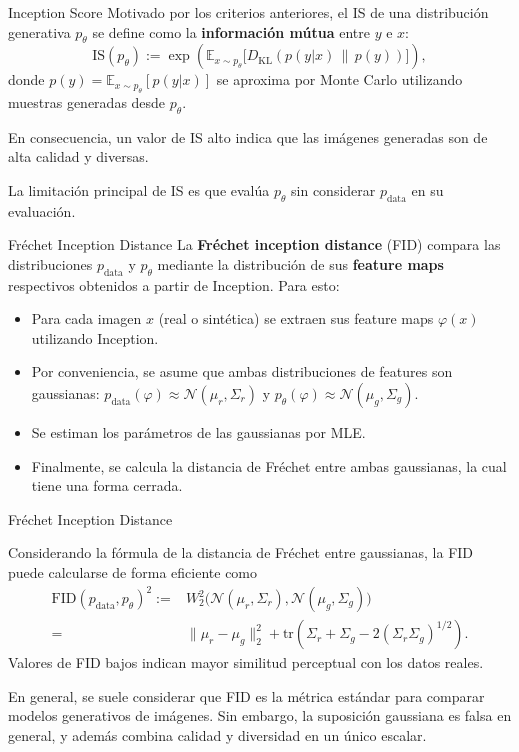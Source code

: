 \documentclass{beamer}
\begin{document}
\begin{frame}{Inception Score}
    Motivado por los criterios anteriores, el IS de una distribución generativa $p_\theta$ se define como la \textbf{información mútua} entre $y$ e $x$:
    \begin{equation*}
        \mathrm{IS}(p_\theta) := \exp\!\left(\mathbb{E}_{x\sim p_\theta}\bigl[D_\mathrm{KL}(p(y|x)\,\|\,p(y))\bigr]\right),
    \end{equation*}
    donde $p(y)=\mathbb{E}_{x\sim p_\theta}[p(y|x)]$ se aproxima por Monte Carlo utilizando muestras generadas desde $p_\theta$.

    En consecuencia, un valor de IS alto indica que las imágenes generadas son de alta calidad y diversas.

    La limitación principal de IS es que evalúa $p_\theta$ sin considerar $p_\text{data}$ en su evaluación.
\end{frame}

\begin{frame}{Fréchet Inception Distance}
    La \textbf{Fréchet inception distance} (FID) compara las distribuciones $p_\text{data}$ y $p_\theta$ mediante la distribución de sus \textbf{feature maps} respectivos obtenidos a partir de Inception. Para esto:
    \begin{itemize}
        \item Para cada imagen $x$ (real o sintética) se extraen sus feature maps $\varphi(x)$ utilizando Inception.
        \item Por conveniencia, se asume que ambas distribuciones de features son gaussianas: $p_\text{data}(\varphi)\approx\mathcal{N}(\mu_r,\Sigma_r)$ y $p_\theta(\varphi)\approx\mathcal{N}(\mu_g,\Sigma_g)$.
        \item Se estiman los parámetros de las gaussianas por MLE.
        \item Finalmente, se calcula la distancia de Fréchet entre ambas gaussianas, la cual tiene una forma cerrada.
    \end{itemize}
\end{frame}

\begin{frame}{Fréchet Inception Distance}

    Considerando la fórmula de la distancia de Fréchet entre gaussianas, la FID puede calcularse de forma eficiente como
    \begin{align*}
        \mathrm{FID}(p_\text{data}, p_\theta)^2
        := & W_2^2\bigl(\mathcal{N}(\mu_r,\Sigma_r),\mathcal{N}(\mu_g,\Sigma_g)\bigr)                       \\
        =  & \|\mu_r-\mu_g\|_2^2 + \mathrm{tr}\!\left(\Sigma_r+\Sigma_g - 2(\Sigma_r\Sigma_g)^{1/2}\right).
    \end{align*}
    Valores de FID bajos indican mayor similitud perceptual con los datos reales.

    En general, se suele considerar que FID es la métrica estándar para comparar modelos generativos de imágenes. Sin embargo, la suposición gaussiana es falsa en general, y además combina calidad y diversidad en un único escalar.
\end{frame}
\end{document}

